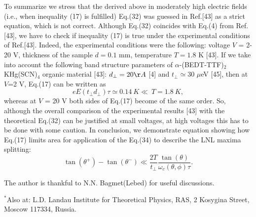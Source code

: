 \documentclass[prl,aps,showpacs,twocolumn,floatfix]{revtex4}
\begin{document}
To summarize we stress that the derived above in moderately high
electric fields (i.e., when inequality (17) is fulfilled) Eq.(32)
was guessed in Ref.[43] as a strict equation, which is not
correct. Although Eq.(32) coincides with Eq.(4) from Ref. [43], we
have to check if inequality (17) is true under the experimental
conditions of Ref.[43]. Indeed, the experimental conditions were
the following: voltage $V$ = 2-20 V, thickness of the sample $d
=0.1$ mm, temperature $T=1.8$ K [43]. If we take into account the
following band structure parameters of
$\alpha$-(BEDT-TTF)$_2$KHg(SCN)$_4$ organic material [43]:
$d_{\perp}=20 \AA$ [4] and $t_{\perp} \simeq 30$ $\mu$eV [45],
then at $V$=2 V, Eq.(17) can be written as
\begin{equation}
 eE(t_{\perp} d_{\perp}) \tau \simeq 0.14 \ K \ll \ T = 1.8 \ K,
\end{equation}
whereas at $V$ = 20 V both sides of Eq.(17) become of the same
order. So, although the overall comparison of the experimental
results [43] with the theoretical Eq.(32) can be justified at
small voltages, at high voltages this has to be done with some
caution. In conclusion, we demonstrate equation showing how
Eq.(17) limits area for application of the Eq.(34) to describe the
LNL maxima splitting:
\begin{equation}
\tan(\theta^+)-\tan(\theta^-) \ll \frac{2T}{t_{\perp}}
\frac{\tan(\theta)}{\omega_c(\theta,\phi)\tau} .
\end{equation}




The author is thankful to N.N. Bagmet(Lebed) for useful
discussions.


$^*$Also at: L.D. Landau Institute for Theoretical Physics, RAS, 2
Kosygina Street, Moscow 117334, Russia.
\end{document}
